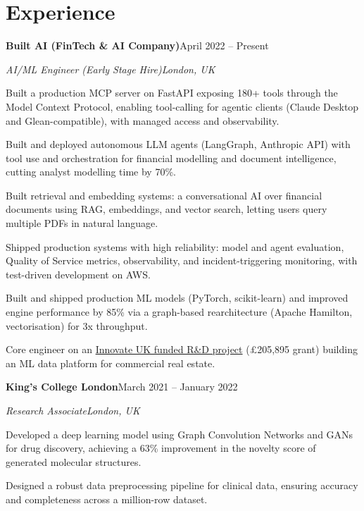 \documentclass[10pt,a4paper]{article}
\newcommand{\entry}[4]{%
  {\color{company}\bfseries #1}\hfill {\color{muted}#2}\par
  \vspace{1pt}
  {\itshape #3}\hfill {\color{muted}\itshape #4}\par
  \vspace{3pt}%
}
\begin{document}
\section{Experience}
\entry{Built AI (FinTech \& AI Company)}{April 2022 -- Present}{AI/ML Engineer (Early Stage Hire)}{London, UK}
\begin{tight}
  \item Built a production MCP server on FastAPI exposing 180+ tools through the Model Context Protocol, enabling tool-calling for agentic clients (Claude Desktop and Glean-compatible), with managed access and observability.
  \item Built and deployed autonomous LLM agents (LangGraph, Anthropic API) with tool use and orchestration for financial modelling and document intelligence, cutting analyst modelling time by 70\%.
  \item Built retrieval and embedding systems: a conversational AI over financial documents using RAG, embeddings, and vector search, letting users query multiple PDFs in natural language.
  \item Shipped production systems with high reliability: model and agent evaluation, Quality of Service metrics, observability, and incident-triggering monitoring, with test-driven development on AWS.
  \item Built and shipped production ML models (PyTorch, scikit-learn) and improved engine performance by 85\% via a graph-based rearchitecture (Apache Hamilton, vectorisation) for 3x throughput.
  \item Core engineer on an \href{https://gtr.ukri.org/projects?ref=10022996}{Innovate UK funded R\&D project} (\pounds205,895 grant) building an ML data platform for commercial real estate.
\end{tight}

\entry{King's College London}{March 2021 -- January 2022}{Research Associate}{London, UK}
\begin{tight}
  \item Developed a deep learning model using Graph Convolution Networks and GANs for drug discovery, achieving a 63\% improvement in the novelty score of generated molecular structures.
  \item Designed a robust data preprocessing pipeline for clinical data, ensuring accuracy and completeness across a million-row dataset.
\end{tight}

\end{document}
